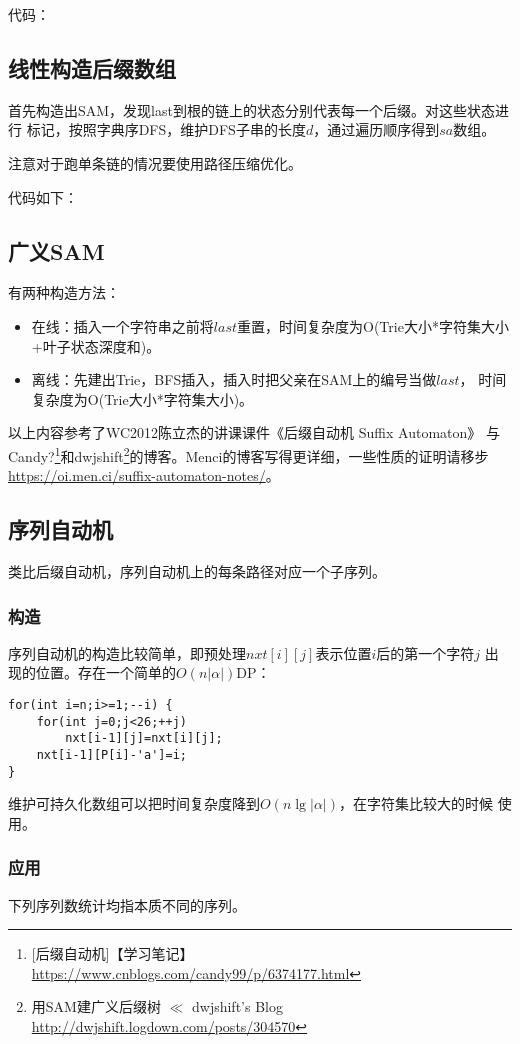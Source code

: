 代码：

\subsection{线性构造后缀数组}
首先构造出SAM，发现last到根的链上的状态分别代表每一个后缀。对这些状态进行
标记，按照字典序DFS，维护DFS子串的长度$d$，通过遍历顺序得到$sa$数组。

注意对于跑单条链的情况要使用路径压缩优化。

代码如下：

\subsection{广义SAM}
有两种构造方法：
\begin{itemize}
    \item 在线：插入一个字符串之前将$last$重置，时间复杂度为O(Trie大小*字符集大小
    +叶子状态深度和)。
    \item 离线：先建出Trie，BFS插入，插入时把父亲在SAM上的编号当做$last$，
    时间复杂度为O(Trie大小*字符集大小)。
\end{itemize}

以上内容参考了WC2012陈立杰的讲课课件《后缀自动机 Suffix Automaton》
与Candy?\footnote{[后缀自动机]【学习笔记】
    \url{https://www.cnblogs.com/candy99/p/6374177.html}
}和dwjshift\footnote{
    用SAM建广义后缀树 $\ll$ dwjshift's Blog
    \url{http://dwjshift.logdown.com/posts/304570}
}的博客。Menci的博客写得更详细，一些性质的证明请移步
\url{https://oi.men.ci/suffix-automaton-notes/}。

\subsection{序列自动机}
类比后缀自动机，序列自动机上的每条路径对应一个子序列。

\subsubsection{构造}
序列自动机的构造比较简单，即预处理$nxt[i][j]$表示位置$i$后的第一个字符$j$
出现的位置。存在一个简单的$O(n|\alpha|)$DP：
\begin{lstlisting}
for(int i=n;i>=1;--i) {
    for(int j=0;j<26;++j)
        nxt[i-1][j]=nxt[i][j];
    nxt[i-1][P[i]-'a']=i;
}
\end{lstlisting}

维护可持久化数组可以把时间复杂度降到$O(n\lg |\alpha|)$，在字符集比较大的时候
使用。
\subsubsection{应用}
下列序列数统计均指本质不同的序列。
